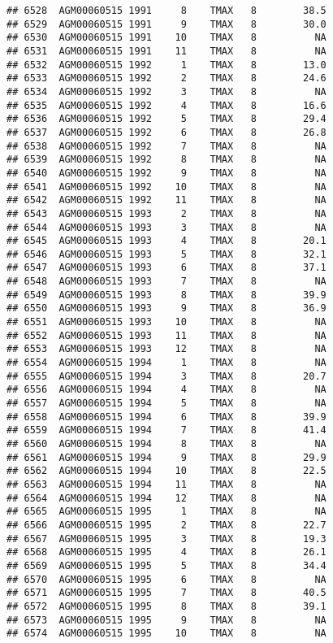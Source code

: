 \documentclass{article}\usepackage[]{graphicx}\usepackage[]{color}
\makeatletter
\newenvironment{kframe}{%
 \def\at@end@of@kframe{}%
 \ifinner\ifhmode%
  \def\at@end@of@kframe{\end{minipage}}%
  \begin{minipage}{\columnwidth}%
 \fi\fi%
 \def\FrameCommand##1{\hskip\@totalleftmargin \hskip-\fboxsep
 \colorbox{shadecolor}{##1}\hskip-\fboxsep
     \hskip-\linewidth \hskip-\@totalleftmargin \hskip\columnwidth}%
 \MakeFramed {\advance\hsize-\width
   \@totalleftmargin\z@ \linewidth\hsize
   \@setminipage}}%
 {\par\unskip\endMakeFramed%
 \at@end@of@kframe}
\newenvironment{knitrout}{}{} %
\makeatother
\begin{document}
\begin{knitrout}
\begin{kframe}
\begin{verbatim}
## 6528  AGM00060515 1991     8    TMAX   8        38.5
## 6529  AGM00060515 1991     9    TMAX   8        30.0
## 6530  AGM00060515 1991    10    TMAX   8          NA
## 6531  AGM00060515 1991    11    TMAX   8          NA
## 6532  AGM00060515 1992     1    TMAX   8        13.0
## 6533  AGM00060515 1992     2    TMAX   8        24.6
## 6534  AGM00060515 1992     3    TMAX   8          NA
## 6535  AGM00060515 1992     4    TMAX   8        16.6
## 6536  AGM00060515 1992     5    TMAX   8        29.4
## 6537  AGM00060515 1992     6    TMAX   8        26.8
## 6538  AGM00060515 1992     7    TMAX   8          NA
## 6539  AGM00060515 1992     8    TMAX   8          NA
## 6540  AGM00060515 1992     9    TMAX   8          NA
## 6541  AGM00060515 1992    10    TMAX   8          NA
## 6542  AGM00060515 1992    11    TMAX   8          NA
## 6543  AGM00060515 1993     2    TMAX   8          NA
## 6544  AGM00060515 1993     3    TMAX   8          NA
## 6545  AGM00060515 1993     4    TMAX   8        20.1
## 6546  AGM00060515 1993     5    TMAX   8        32.1
## 6547  AGM00060515 1993     6    TMAX   8        37.1
## 6548  AGM00060515 1993     7    TMAX   8          NA
## 6549  AGM00060515 1993     8    TMAX   8        39.9
## 6550  AGM00060515 1993     9    TMAX   8        36.9
## 6551  AGM00060515 1993    10    TMAX   8          NA
## 6552  AGM00060515 1993    11    TMAX   8          NA
## 6553  AGM00060515 1993    12    TMAX   8          NA
## 6554  AGM00060515 1994     1    TMAX   8          NA
## 6555  AGM00060515 1994     3    TMAX   8        20.7
## 6556  AGM00060515 1994     4    TMAX   8          NA
## 6557  AGM00060515 1994     5    TMAX   8          NA
## 6558  AGM00060515 1994     6    TMAX   8        39.9
## 6559  AGM00060515 1994     7    TMAX   8        41.4
## 6560  AGM00060515 1994     8    TMAX   8          NA
## 6561  AGM00060515 1994     9    TMAX   8        29.9
## 6562  AGM00060515 1994    10    TMAX   8        22.5
## 6563  AGM00060515 1994    11    TMAX   8          NA
## 6564  AGM00060515 1994    12    TMAX   8          NA
## 6565  AGM00060515 1995     1    TMAX   8          NA
## 6566  AGM00060515 1995     2    TMAX   8        22.7
## 6567  AGM00060515 1995     3    TMAX   8        19.3
## 6568  AGM00060515 1995     4    TMAX   8        26.1
## 6569  AGM00060515 1995     5    TMAX   8        34.4
## 6570  AGM00060515 1995     6    TMAX   8          NA
## 6571  AGM00060515 1995     7    TMAX   8        40.5
## 6572  AGM00060515 1995     8    TMAX   8        39.1
## 6573  AGM00060515 1995     9    TMAX   8          NA
## 6574  AGM00060515 1995    10    TMAX   8          NA

\end{verbatim}
\end{kframe}
\end{knitrout}
\end{document}
